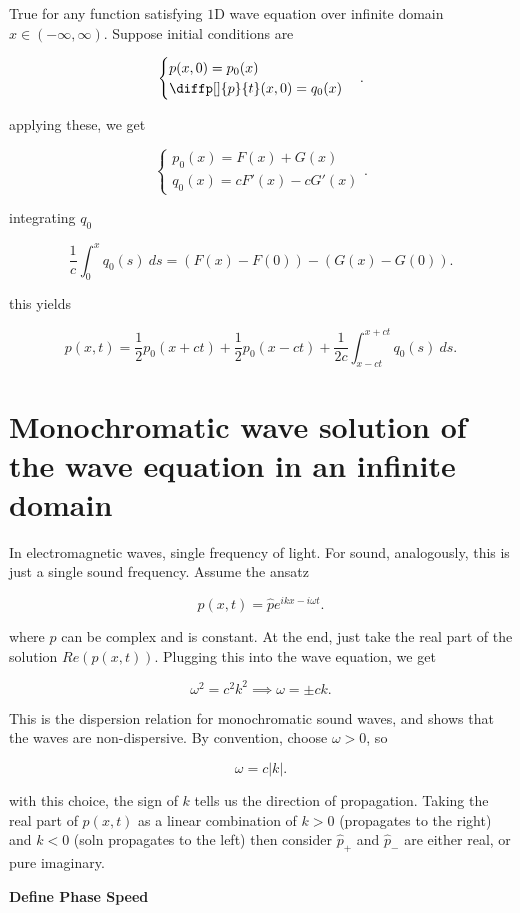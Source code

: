 True for any function satisfying $1$D wave equation over infinite domain $x\in
(-\infty,\infty)$. Suppose initial conditions are

\[
\begin{cases}
  p(x,0) = p_0(x) \\
  \diffp[]{p}{t}(x,0) = q_0(x)
\end{cases}
.\] 

applying these, we get

\[
\begin{cases}
  p_0(x) = F(x) + G(x) \\
  q_0(x) = cF'(x) -cG'(x)
\end{cases}
.\] 

integrating $q_0$ 

\[
\frac{1}{c}  \int_{0}^{x} {q_0(s)} \: d{s} = (F(x)-F(0)) - (G(x) -G(0))
.\] 

this yields

\[
  p(x,t) = \frac{1}{2}p_0(x+ct) + \frac{1}{2}p_0(x-ct) + \frac{1}{2c}
  \int_{x-ct}^{x+ct} {q_0(s)} \: d{s} 
.\]

\section{Monochromatic wave solution of the wave equation in an infinite domain}%

In electromagnetic waves, single frequency of light. For sound, analogously,
this is just a single sound frequency. Assume the ansatz

\[
  p(x,t) = \hat p e^{ikx-i \omega t}
.\] 

where $\hat p$ can be complex and is constant. At the end, just take the real
part of the solution $Re(p(x,t))$. Plugging this into the wave equation, we get

\[
\omega^{2} = c^{2}k^{2} \implies \omega = \pm ck
.\] 

This is the dispersion relation for monochromatic sound waves, and shows that
the waves are non-dispersive. By convention, choose $ \omega>0$, so

\[
\omega = c|k|
.\] 

with this choice, the sign of $k$ tells us the direction of propagation. Taking
the real part of $p(x,t)$ as a linear combination of $k>0$ (propagates to the
right) and $k<0$ (soln propagates to the left) then
consider $\hat p_{+}$ and $\hat p_{-}$ are either real, or pure imaginary.


\textbf{Define Phase Speed}

